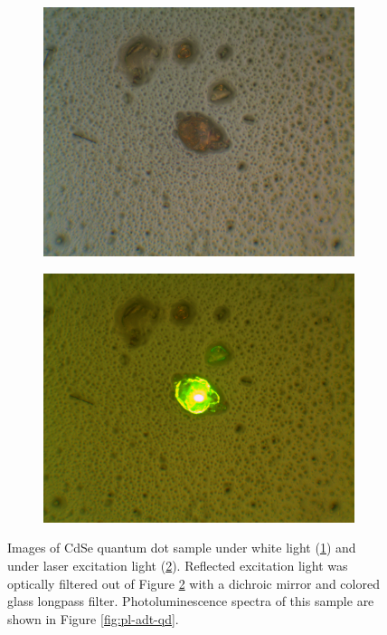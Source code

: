 \begin{figure}[H]
    \centering
    \begin{subfigure}[b]{0.45\textwidth}
        \includegraphics[width=\textwidth]{./img/qd-white-illum.png}
        \caption{}
        \label{img:qd-white}
    \end{subfigure}
    \hfill
    \begin{subfigure}[b]{0.45\textwidth}
        \includegraphics[width=\textwidth]{./img/qd-laser-illum.png}
        \caption{}
        \label{img:qd-laser}
    \end{subfigure}
    \caption[Images of CdSe quantum dot sample.]{Images of CdSe quantum dot sample under white light (\ref{img:qd-white}) and under laser excitation light (\ref{img:qd-laser}). Reflected excitation light was optically filtered out of Figure \ref{img:qd-laser} with a dichroic mirror and colored glass longpass filter. Photoluminescence spectra of this sample are shown in Figure \ref{fig:pl-adt-qd}.}
    \label{img:qd}
\end{figure}

